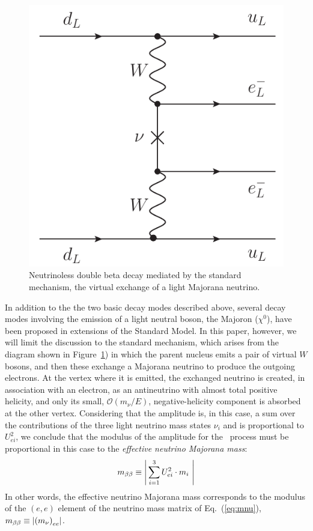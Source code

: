\documentclass{PoS}
\begin{document}
\begin{figure}
\centering
\includegraphics[scale=0.6]{img/LightNuExchange.pdf}
\caption{Neutrinoless double beta decay mediated by the standard mechanism, the virtual exchange of a light Majorana neutrino.} \label{fig:LightMajoranaNuExchange}
\end{figure}

In addition to the the two basic decay modes described above, several decay modes involving the emission of a light neutral boson, the Majoron ($\chi^{0}$), have been proposed in extensions of the Standard Model. In this paper, however, we will limit the discussion to the standard mechanism, which arises from the diagram shown in Figure~\ref{fig:LightMajoranaNuExchange}) in which the parent nucleus emits a pair of virtual $W$ bosons, and then these exchange a Majorana neutrino to produce the outgoing electrons. At the vertex where it is emitted, the exchanged neutrino is created, in association with an electron, as an antineutrino with almost total positive helicity, and only its small, $\mathcal{O}(m_{\nu}/E)$, negative-helicity component is absorbed at the other vertex. Considering that the amplitude is, in this case, a sum over the contributions of the three light neutrino mass states $\nu_i$ and is proportional to $U_{ei}^2$, we conclude that the modulus of the amplitude for the \bbonu\ process must be proportional in this case to the \emph{effective neutrino Majorana mass}:
\begin{equation}
\mbb \equiv \left|\, \sum_{i=1}^3 U_{ei}^2\cdot m_i\ \right| \label{eq:mbb}
\end{equation}
In other words, the effective neutrino Majorana mass corresponds to the modulus of the $(e,e)$ element of the neutrino mass matrix of Eq.~(\ref{eq:mnu}), $m_{\beta\beta}\equiv \left|\left(m_{\nu}\right)_{ee}\right|$.
\end{document}
